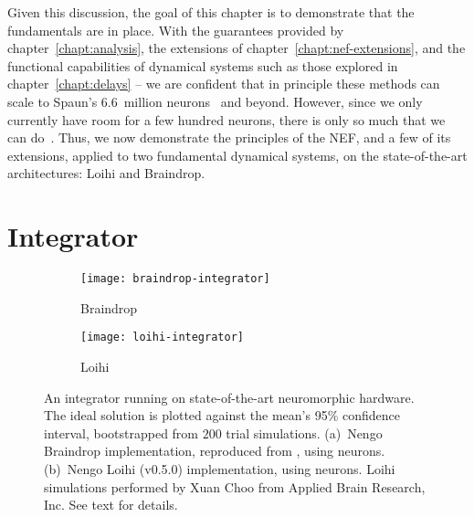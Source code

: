 Given this discussion, the goal of this chapter is to demonstrate that the fundamentals are in place.
With the guarantees provided by chapter~\ref{chapt:analysis}, the extensions of chapter~\ref{chapt:nef-extensions}, and the functional capabilities of dynamical systems such as those explored in chapter~\ref{chapt:delays} -- we are confident that in principle these methods can scale to Spaun's 6.6~million neurons~\citep{choo2018} and beyond.
However, since we only currently have room for a few hundred neurons, there is only so much that we can do~\citep{blouw2018a}.
Thus, we now demonstrate the principles of the NEF, and a few of its extensions, applied to two fundamental dynamical systems, on the state-of-the-art architectures: Loihi and Braindrop.

\section{Integrator}
\label{sec:integrator}

\begin{figure}
  \centering
  \begin{subfigure}{.5\textwidth}
    \centering
    \texttt{[image: braindrop-integrator]}
    \caption{Braindrop}
    \label{fig:braindrop-integrator}
  \end{subfigure}%
  \begin{subfigure}{.5\textwidth}
    \centering
    \texttt{[image: loihi-integrator]}
    \caption{Loihi}
    \label{fig:loihi-integrator}
  \end{subfigure}
  \caption[Dynamical integration on Braindrop and Loihi.]{
    An integrator running on state-of-the-art neuromorphic hardware.
    The ideal solution is plotted against the mean's 95\% confidence interval, bootstrapped from $200$ trial simulations.
    (a)~Nengo Braindrop implementation, reproduced from \citet[][Figure~15]{braindrop2019}, using  neurons. 
    (b)~Nengo Loihi (v0.5.0) implementation, using  neurons.
    Loihi simulations performed by Xuan Choo from Applied Brain Research, Inc.
    See text for details.
  }\label{fig:integrator-neuromorphic}
\end{figure}


